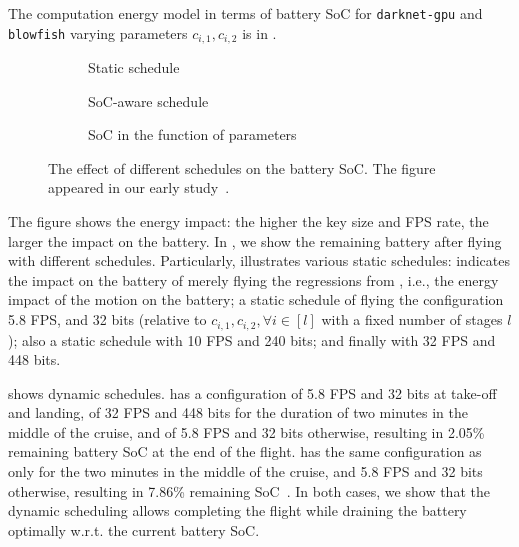 The computation energy model in terms of battery SoC for {\small\tt darknet-gpu} and {\small\tt blowfish} varying parameters $c_{i,1},c_{i,2}$ is in . 
\begin{figure}[h!]
  \centering
  \selectfont
  \footnotesize
  \begin{subfigure}[t]{0.31\textwidth}
    \centering
    
    \caption{Static schedule}
    \label{fig:soc-configuration}
  \end{subfigure}
  \begin{subfigure}[t]{0.26\textwidth}
    \centering
    
    \caption{SoC-aware schedule}
    \label{fig:soc-schedule}
  \end{subfigure}
  \begin{subfigure}[t]{0.41\textwidth}
    \centering
    
    \caption{SoC in the function of parameters}
    \label{fig:soc-plot}
  \end{subfigure}
  \caption[The effect of different schedules on the battery SoC]{The effect of different schedules on the battery SoC. The figure appeared in our early study~\citep{seewald2020mechanical}.}
  \label{fig:soc-evolution}
\end{figure}
The figure shows the energy impact: the higher the key size and FPS rate, the larger the impact on the battery. In , we show the remaining battery after flying with different schedules. Particularly,  illustrates various static schedules:  indicates the impact on the battery of merely flying the regressions from , i.e., the energy impact of the motion on the battery;  a static schedule of flying the configuration 5.8 FPS, and 32 bits (relative to $c_{i,1},c_{i,2},\forall i\in[l]$ with a fixed number of stages $l$);  also a static schedule with 10 FPS and 240 bits; and finally  with 32 FPS and 448 bits.

 shows dynamic schedules.  has a configuration of 5.8 FPS and 32 bits at take-off and landing, of 32 FPS and 448 bits for the duration of two minutes in the middle of the cruise, and of 5.8 FPS and 32 bits otherwise, resulting in 2.05\% remaining battery SoC at the end of the flight.  has the same configuration as  only for the two minutes in the middle of the cruise, and 5.8 FPS and 32 bits otherwise, resulting in 7.86\% remaining SoC~\citep{seewald2020mechanical}. In both cases, we show that the dynamic scheduling allows completing the flight while draining the battery optimally w.r.t. the current battery SoC.

